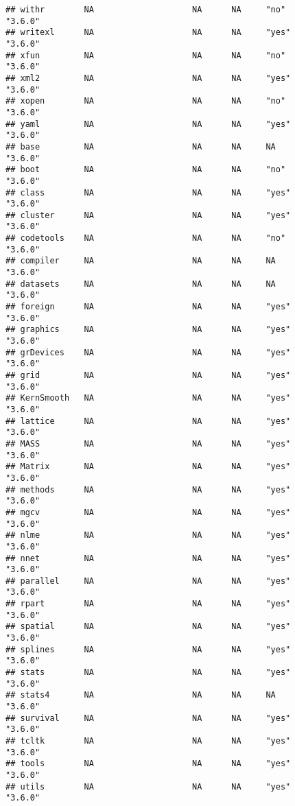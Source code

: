 \documentclass[]{book}
\begin{document}
\begin{verbatim}
## withr        NA                    NA      NA     "no"             "3.6.0"
## writexl      NA                    NA      NA     "yes"            "3.6.0"
## xfun         NA                    NA      NA     "no"             "3.6.0"
## xml2         NA                    NA      NA     "yes"            "3.6.0"
## xopen        NA                    NA      NA     "no"             "3.6.0"
## yaml         NA                    NA      NA     "yes"            "3.6.0"
## base         NA                    NA      NA     NA               "3.6.0"
## boot         NA                    NA      NA     "no"             "3.6.0"
## class        NA                    NA      NA     "yes"            "3.6.0"
## cluster      NA                    NA      NA     "yes"            "3.6.0"
## codetools    NA                    NA      NA     "no"             "3.6.0"
## compiler     NA                    NA      NA     NA               "3.6.0"
## datasets     NA                    NA      NA     NA               "3.6.0"
## foreign      NA                    NA      NA     "yes"            "3.6.0"
## graphics     NA                    NA      NA     "yes"            "3.6.0"
## grDevices    NA                    NA      NA     "yes"            "3.6.0"
## grid         NA                    NA      NA     "yes"            "3.6.0"
## KernSmooth   NA                    NA      NA     "yes"            "3.6.0"
## lattice      NA                    NA      NA     "yes"            "3.6.0"
## MASS         NA                    NA      NA     "yes"            "3.6.0"
## Matrix       NA                    NA      NA     "yes"            "3.6.0"
## methods      NA                    NA      NA     "yes"            "3.6.0"
## mgcv         NA                    NA      NA     "yes"            "3.6.0"
## nlme         NA                    NA      NA     "yes"            "3.6.0"
## nnet         NA                    NA      NA     "yes"            "3.6.0"
## parallel     NA                    NA      NA     "yes"            "3.6.0"
## rpart        NA                    NA      NA     "yes"            "3.6.0"
## spatial      NA                    NA      NA     "yes"            "3.6.0"
## splines      NA                    NA      NA     "yes"            "3.6.0"
## stats        NA                    NA      NA     "yes"            "3.6.0"
## stats4       NA                    NA      NA     NA               "3.6.0"
## survival     NA                    NA      NA     "yes"            "3.6.0"
## tcltk        NA                    NA      NA     "yes"            "3.6.0"
## tools        NA                    NA      NA     "yes"            "3.6.0"
## utils        NA                    NA      NA     "yes"            "3.6.0"
\end{verbatim}
\end{document}
